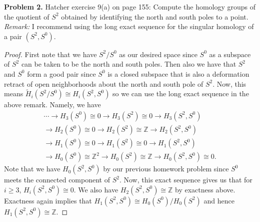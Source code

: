 \documentclass[leqno]{article}
\theoremstyle{nonumberplain}
\newtheorem{proof}{Proof}
\newcommand{\Z}{\mathbb{Z}}
\begin{document}
\vspace*{1cm}


\noindent\textbf{Problem 2.} 
Hatcher exercise 9(a) on page 155: Compute the homology groups of the quotient of $S^2$ obtained by identifying the north and south poles to a point.\\

\noindent \emph{Remark:} I recommend using the long exact sequence for the singular homology of a pair $(S^2,S^0)$.

\begin{proof}
First note that we have $S^2/S^0$ as our desired space since $S^0$ as a subspace of $S^2$ can be taken to be the north and south poles.  Then also we have that $S^2$ and $S^0$ form a good pair since $S^0$ is a closed subspace that is also a deformation retract of open neighborhoods about the north and south pole of $S^2$.  Now, this means $\tilde{H}_i(S^2/S^0)\cong H_i(S^2,S^0)$ so we can use the long exact sequence in the above remark. Namely, we have
\begin{align*}
\cdots \rightarrow H_3(S^0) \cong 0 \rightarrow H_3(S^2)\cong 0 \rightarrow H_3(S^2,S^0) \\
\rightarrow H_2(S^0) \cong 0\rightarrow H_2(S^2)\cong \Z \rightarrow H_2(S^2,S^0)\\
\rightarrow H_1(S^0)\cong 0 \rightarrow H_1(S^2) \cong 0 \rightarrow H_1(S^2,S^0)\\
\rightarrow H_0(S^0)\cong \Z^2\rightarrow H_0(S^2)\cong \Z \rightarrow H_0(S^2,S^0)\cong 0.   
\end{align*}
Note that we have $H_0(S^2,S^0)$ by our previous homework problem since $S^0$ meets the connected component of $S^2$. Now, this exact sequence gives us that for $i\geq 3$, $H_i(S^2,S^0)\cong 0$. We also have $H_2(S^2,S^0)\cong \Z$ by exactness above. Exactness again implies that $H_1(S^2,S^0)\cong H_0(S^0)/H_0(S^2)$ and hence $H_1(S^2,S^0)\cong \Z$.
\end{proof}
\end{document}

